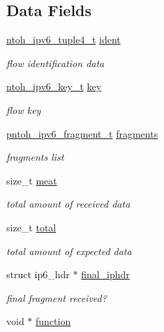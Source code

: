 \subsection*{Data Fields}
\begin{DoxyCompactItemize}
\item 
\hyperlink{structntoh__ipv6__tuple4__t}{ntoh\-\_\-ipv6\-\_\-tuple4\-\_\-t} \hyperlink{structntoh__ipv6__flow__t_ae6f21eaeed6948ec645d7d94a37c3140}{ident}
\begin{DoxyCompactList}\small\item\em flow identification data \end{DoxyCompactList}\item 
\hyperlink{ipv6defrag_8h_a078ba881dae0588c609a3556dc5909ca}{ntoh\-\_\-ipv6\-\_\-key\-\_\-t} \hyperlink{structntoh__ipv6__flow__t_a8c3b4b46820e7d3e3af76db78a1dbb3e}{key}
\begin{DoxyCompactList}\small\item\em flow key \end{DoxyCompactList}\item 
\hyperlink{ipv6defrag_8h_ae909c7bd6d9a37597f561a92ab1ba2a7}{pntoh\-\_\-ipv6\-\_\-fragment\-\_\-t} \hyperlink{structntoh__ipv6__flow__t_abecfe5b83d9c9dfb2815e0579ea909fc}{fragments}
\begin{DoxyCompactList}\small\item\em fragments list \end{DoxyCompactList}\item 
size\-\_\-t \hyperlink{structntoh__ipv6__flow__t_a25cdc91a1ce3b46649beaacf6315dee7}{meat}
\begin{DoxyCompactList}\small\item\em total amount of received data \end{DoxyCompactList}\item 
size\-\_\-t \hyperlink{structntoh__ipv6__flow__t_a3fab45bb4d7cd7e889bdf00080096e8e}{total}
\begin{DoxyCompactList}\small\item\em total amount of expected data \end{DoxyCompactList}\item 
struct ip6\-\_\-hdr $\ast$ \hyperlink{structntoh__ipv6__flow__t_aacadfda29e478e69be73c3f2e6bf9c79}{final\-\_\-iphdr}
\begin{DoxyCompactList}\small\item\em final fragment received? \end{DoxyCompactList}\item 
void $\ast$ \hyperlink{structntoh__ipv6__flow__t_aea3dcf0c8de30d192ee92494131c4996}{function}

\end{DoxyCompactItemize}
